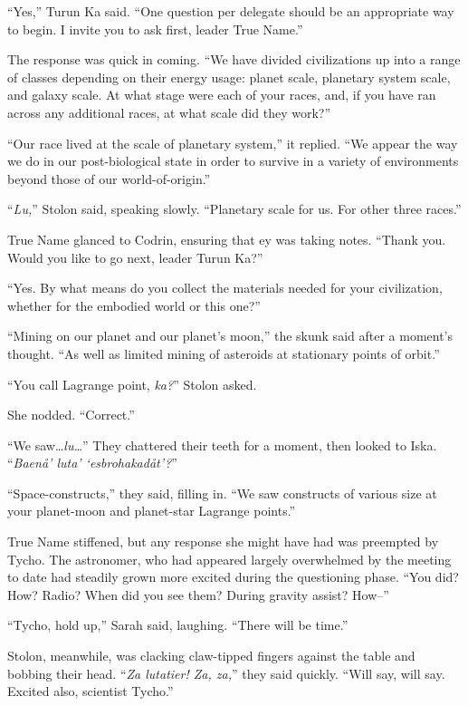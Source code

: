 ``Yes,'' Turun Ka said. ``One question per delegate should be an appropriate way to begin. I invite you to ask first, leader True Name.''

The response was quick in coming. ``We have divided civilizations up into a range of classes depending on their energy usage: planet scale, planetary system scale, and galaxy scale. At what stage were each of your races, and, if you have ran across any additional races, at what scale did they work?''

``Our race lived at the scale of planetary system,'' it replied. ``We appear the way we do in our post-biological state in order to survive in a variety of environments beyond those of our world-of-origin.''

``\emph{Lu,}'' Stolon said, speaking slowly. ``Planetary scale for us. For other three races.''

True Name glanced to Codrin, ensuring that ey was taking notes. ``Thank you. Would you like to go next, leader Turun Ka?''

``Yes. By what means do you collect the materials needed for your civilization, whether for the embodied world or this one?''

``Mining on our planet and our planet's moon,'' the skunk said after a moment's thought. ``As well as limited mining of asteroids at stationary points of orbit.''

``You call Lagrange point, \emph{ka?}'' Stolon asked.

She nodded. ``Correct.''

``We saw\ldots{}\emph{lu\ldots{}}'' They chattered their teeth for a moment, then looked to Iska. ``\emph{Baenå' luta' `esbrohakadåt'?}''

``Space-constructs,'' they said, filling in. ``We saw constructs of various size at your planet-moon and planet-star Lagrange points.''

True Name stiffened, but any response she might have had was preempted by Tycho. The astronomer, who had appeared largely overwhelmed by the meeting to date had steadily grown more excited during the questioning phase. ``You did? How? Radio? When did you see them? During gravity assist? How--''

``Tycho, hold up,'' Sarah said, laughing. ``There will be time.''

Stolon, meanwhile, was clacking claw-tipped fingers against the table and bobbing their head. ``\emph{Za lutatier! Za, za,}'' they said quickly. ``Will say, will say. Excited also, scientist Tycho.''

